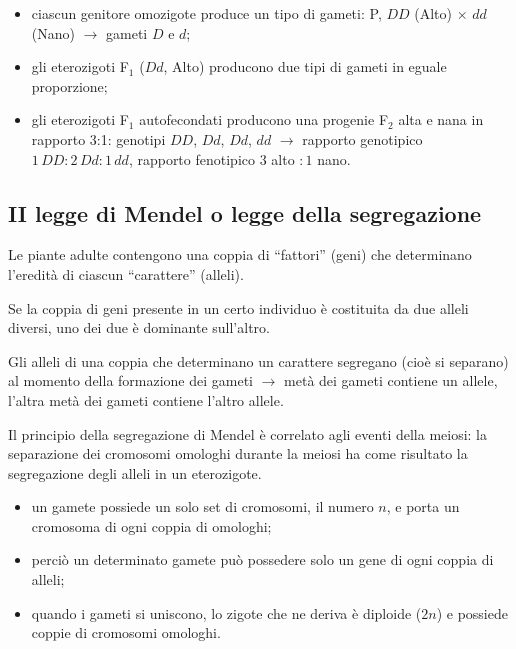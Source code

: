 \begin{itemize}
  \item ciascun genitore omozigote produce un tipo di gameti: P, $DD$ (Alto) $\times$ $dd$ (Nano) $\rightarrow$ gameti $D$ e $d$;
  \item gli eterozigoti F$_1$ ($Dd$, Alto) producono due tipi di gameti in eguale proporzione;
  \item gli eterozigoti F$_1$ autofecondati producono una progenie F$_2$ alta e nana in rapporto 3:1: genotipi $DD$, $Dd$, $Dd$, $dd$ $\rightarrow$ rapporto genotipico $1\,DD : 2\,Dd : 1\,dd$, rapporto fenotipico $3$ alto $: 1$ nano.
\end{itemize}

\subsection{II legge di Mendel o legge della segregazione}

Le piante adulte contengono una coppia di ``fattori'' (geni) che determinano l'eredità di ciascun ``carattere'' (alleli).

Se la coppia di geni presente in un certo individuo è costituita da due alleli diversi, uno dei due è dominante sull'altro.

Gli alleli di una coppia che determinano un carattere segregano (cioè si separano) al momento della formazione dei gameti $\rightarrow$ metà dei gameti contiene un allele, l'altra metà dei gameti contiene l'altro allele.

Il principio della segregazione di Mendel è correlato agli eventi della meiosi: la separazione dei cromosomi omologhi durante la meiosi ha come risultato la segregazione degli alleli in un eterozigote.
\begin{itemize}
  \item un gamete possiede un solo set di cromosomi, il numero $n$, e porta un cromosoma di ogni coppia di omologhi;
  \item perciò un determinato gamete può possedere solo un gene di ogni coppia di alleli;
  \item quando i gameti si uniscono, lo zigote che ne deriva è diploide ($2n$) e possiede coppie di cromosomi omologhi.
\end{itemize}

